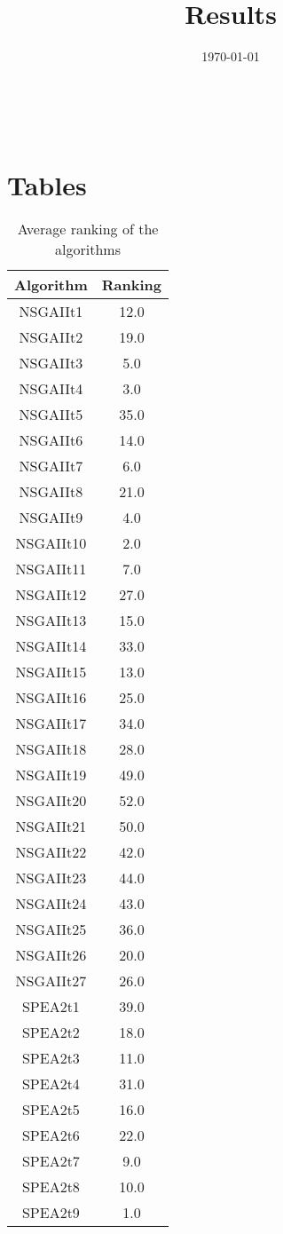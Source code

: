 \documentclass{article}
\title{Results}
\author{}
\date{\today}
\begin{document}
\oddsidemargin 0in \topmargin 0in\maketitle
\
\section{Tables}
\begin{table}[!htp]
\centering
\caption{Average ranking of the algorithms}
\begin{tabular}{c|c}
Algorithm&Ranking\\
\hline
NSGAIIt1&12.0\\
NSGAIIt2&19.0\\
NSGAIIt3&5.0\\
NSGAIIt4&3.0\\
NSGAIIt5&35.0\\
NSGAIIt6&14.0\\
NSGAIIt7&6.0\\
NSGAIIt8&21.0\\
NSGAIIt9&4.0\\
NSGAIIt10&2.0\\
NSGAIIt11&7.0\\
NSGAIIt12&27.0\\
NSGAIIt13&15.0\\
NSGAIIt14&33.0\\
NSGAIIt15&13.0\\
NSGAIIt16&25.0\\
NSGAIIt17&34.0\\
NSGAIIt18&28.0\\
NSGAIIt19&49.0\\
NSGAIIt20&52.0\\
NSGAIIt21&50.0\\
NSGAIIt22&42.0\\
NSGAIIt23&44.0\\
NSGAIIt24&43.0\\
NSGAIIt25&36.0\\
NSGAIIt26&20.0\\
NSGAIIt27&26.0\\
SPEA2t1&39.0\\
SPEA2t2&18.0\\
SPEA2t3&11.0\\
SPEA2t4&31.0\\
SPEA2t5&16.0\\
SPEA2t6&22.0\\
SPEA2t7&9.0\\
SPEA2t8&10.0\\
SPEA2t9&1.0\\

\end{tabular}
\end{table}
\end{document}
